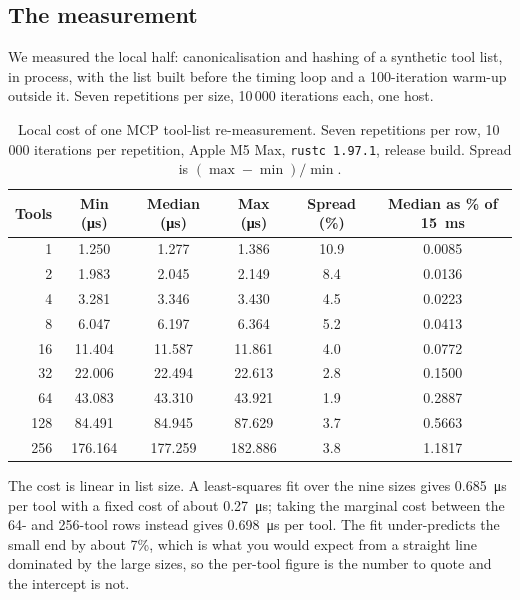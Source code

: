 \documentclass[11pt]{article}
\begin{document}
\subsection{The measurement}

We measured the local half: canonicalisation and hashing of a synthetic tool
list, in process, with the list built before the timing loop and a
100-iteration warm-up outside it. Seven repetitions per size, 10\,000
iterations each, one host.

\begin{table}[htbp]
\centering
\small
{}
\begin{tabular}{@{}rS[table-format=3.3]S[table-format=3.3]S[table-format=3.3]S[table-format=2.1]S[table-format=1.4]@{}}
\toprule
\textbf{Tools} & {\textbf{Min} (\si{\micro\second})} &
{\textbf{Median} (\si{\micro\second})} & {\textbf{Max} (\si{\micro\second})} &
{\textbf{Spread} (\%)} & {\textbf{Median as \% of \SI{15}{\milli\second}}} \\
   & 1.250   & 1.277   & 1.386   & 10.9 & 0.0085 \\
2   & 1.983   & 2.045   & 2.149   & 8.4  & 0.0136 \\
4   & 3.281   & 3.346   & 3.430   & 4.5  & 0.0223 \\
8   & 6.047   & 6.197   & 6.364   & 5.2  & 0.0413 \\
16  & 11.404  & 11.587  & 11.861  & 4.0  & 0.0772 \\
32  & 22.006  & 22.494  & 22.613  & 2.8  & 0.1500 \\
64  & 43.083  & 43.310  & 43.921  & 1.9  & 0.2887 \\
128 & 84.491  & 84.945  & 87.629  & 3.7  & 0.5663 \\
256 & 176.164 & 177.259 & 182.886 & 3.8  & 1.1817 \\
\bottomrule
\end{tabular}
\caption{Local cost of one MCP tool-list re-measurement. Seven repetitions per
row, 10\,000 iterations per repetition, Apple M5 Max, \texttt{rustc 1.97.1},
release build. Spread is $(\max-\min)/\min$.}
\label{tab:cost}
\end{table}

The cost is linear in list size. A least-squares fit over the nine sizes gives
\SI{0.685}{\micro\second} per tool with a fixed cost of about
\SI{0.27}{\micro\second}; taking the marginal cost between the 64- and
256-tool rows instead gives \SI{0.698}{\micro\second} per tool. The fit
under-predicts the small end by about 7\%, which is what you would expect from
a straight line dominated by the large sizes, so the per-tool figure is the
number to quote and the intercept is not.
\end{document}
